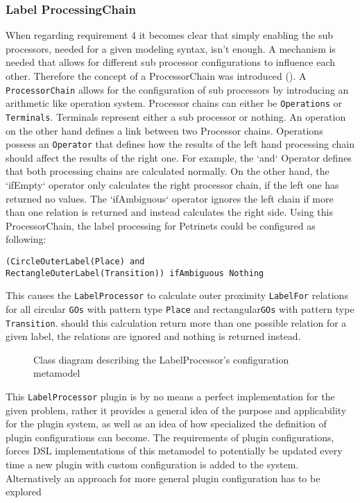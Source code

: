 \subsubsection{Label ProcessingChain}
When regarding requirement 4 it becomes clear that simply enabling the sub processors, needed for a given modeling syntax, isn't enough. A mechanism is needed that allows for different sub processor configurations to influence each other. Therefore the concept of a ProcessorChain was introduced (). A \texttt{ProcessorChain} allows for the configuration of sub processors by introducing an arithmetic like operation system. Processor chains can either be \texttt{Operations} or \texttt{Terminals}. Terminals represent either a sub processor or nothing. An operation on the other hand defines a link between two Processor chains. Operations possess an \texttt{Operator} that defines how the results of the left hand processing chain should affect the results of the right one. For example, the `and` Operator defines that both processing chains are calculated normally. On the other hand, the `ifEmpty` operator only calculates the right processor chain, if the left one has returned no values. The `ifAmbiguous` operator ignores the left chain if more than one relation is returned and instead calculates the right side. Using this ProcessorChain, the label processing for Petrinets could be configured as following:
\begin{lstlisting}
(CircleOuterLabel(Place) and 
RectangleOuterLabel(Transition)) ifAmbiguous Nothing
\end{lstlisting}
This causes the \texttt{LabelProcessor} to calculate outer proximity \texttt{LabelFor} relations for all circular \texttt{GOs} with pattern type \texttt{Place} and rectangular\texttt{GOs} with pattern type \texttt{Transition}. should this calculation return more than one possible relation for a given label, the relations are ignored and nothing is returned instead.

\begin{figure}[ht]
  \centering
  
  \caption{Class diagram describing the LabelProcessor's configuration metamodel}
  \label{fig:labelprocessor-config}
\end{figure}

This \texttt{LabelProcessor} plugin is by no means a perfect implementation for the given problem, rather it provides a general idea of the purpose and applicability for the plugin system, as well as an idea of how specialized the definition of plugin configurations can become. The requirements of plugin configurations, forces DSL implementations of this metamodel to potentially be updated every time a new plugin with custom configuration is added to the system. Alternatively an approach for more general plugin configuration has to be explored


